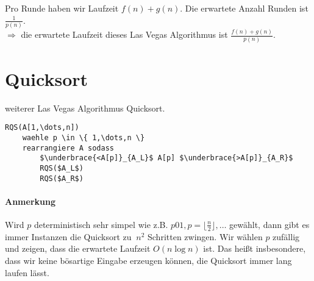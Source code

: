 Pro Runde haben wir Laufzeit $f(n)+g(n)$. Die erwartete Anzahl Runden ist $\frac{1}{p(n)}$. \\
$\Rightarrow$ die erwartete Laufzeit dieses Las Vegas Algorithmus ist $\frac{f(n)+g(n)}{p(n)}$.

\section{Quicksort}
weiterer Las Vegas Algorithmus Quicksort.
\begin{lstlisting}[mathescape]
RQS(A[1,\dots,n])
	waehle p \in \{ 1,\dots,n \}
	rearrangiere A sodass
		$\underbrace{<A[p]}_{A_L}$ A[p] $\underbrace{>A[p]}_{A_R}$
		RQS($A_L$)
		RQS($A_R$)
\end{lstlisting}

\paragraph*{Anmerkung} Wird $p$ deterministisch sehr simpel wie z.B. $p01,p=\lfloor\frac{n}{2}\rfloor,\dots$ gewählt, dann gibt es immer Instanzen die Quicksort zu $~n^2$ Schritten zwingen.
Wir wählen $p$ zufällig und zeigen, dass die erwartete Laufzeit $O(n \log n)$ ist. Das heißt insbesondere, dass wir keine bösartige Eingabe erzeugen können, die Quicksort immer lang laufen lässt.